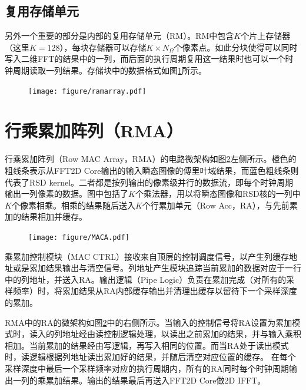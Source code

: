 \documentclass[master]{shtthesis}             %
\begin{document}
\subsection{复用存储单元}

另外一个重要的部分是内部的复用存储单元（RM）。RM中包含$K$个片上存储器（这里$K=128$），每块存储器可以存储$K\times N_\Omega$个像素点。如此分块使得可以同时写入二维FFT的结果中的一列，而后面的执行周期复用这一结果时也可以一个时钟周期读取一列结果。存储块中的数据格式如图\ref{fig:ram_array}所示。
\begin{figure}[!tb]
    \centering
    \texttt{[image: figure/ramarray.pdf]}
    \label{fig:ram_array}
\end{figure}

\section{行乘累加阵列（RMA）}\label{sec:rowmacarray}

行乘累加阵列（Row MAC Array，RMA）的电路微架构如图\ref{fig:macarr}左侧所示。橙色的粗线条表示从FFT2D Core输出的输入瞬态图像的傅里叶域结果，而蓝色粗线条则代表了RSD kernel。二者都是按列输出的像素级并行的数据流，即每个时钟周期输出一列像素的数据。图中包括了$K$个乘法器，用以将瞬态图像和RSD核的一列中$K$个像素相乘。相乘的结果随后送入$K$个行累加单元（Row Acc，RA），与先前累加的结果相加并缓存。
\begin{figure}[!tb]
    \centering
    \texttt{[image: figure/MACA.pdf]}
    \label{fig:macarr}
\end{figure}
乘累加控制模块（MAC CTRL）接收来自顶层的控制调度信号，以产生列缓存地址或是累加结果输出与清空信号。列地址产生模块追踪当前累加的数据对应于一行中的列地址，并送入RA。输出逻辑（Pipe Logic）负责在累加完成（对所有的采样频率）时，将累加结果从RA内部缓存输出并清理出缓存以留待下一个采样深度的累加。

RMA中的RA的微架构如图\ref{fig:macarr}中的右侧所示。当输入的控制信号将RA设置为累加模式时，读入的列地址经由读控制逻辑处理，以读出之前累加的结果，并与输入乘积相加。当前累加的结果经由写逻辑，再写入相同的位置。而当RA处于读出模式时，读逻辑根据列地址读出累加好的结果，并随后清空对应位置的缓存。
在每个采样深度中最后一个采样频率对应的执行周期内，所有的RA同时每个时钟周期输出一列的乘累加结果。输出的结果最后再送入FFT2D Core做2D IFFT。
\end{document}
